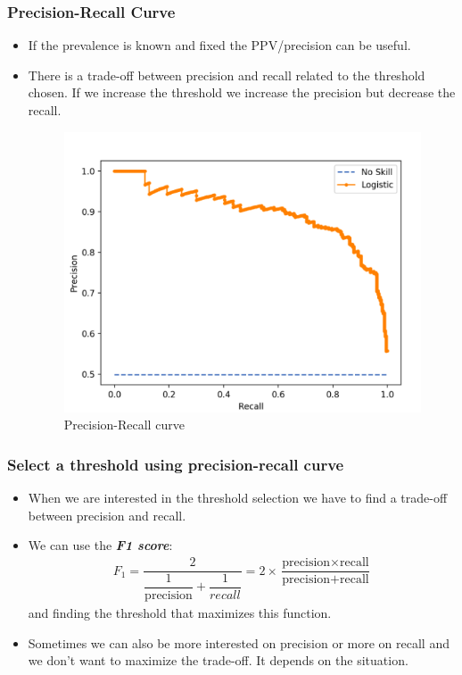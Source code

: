 \documentclass[9pt]{beamer}
\begin{document}
\begin{frame}
\frametitle{Precision-Recall Curve}
\begin{itemize}
\item If the prevalence is known and fixed the PPV/precision can be useful.
\item There is a trade-off between precision and recall related to the threshold chosen. If we increase the threshold we increase the precision but decrease the recall.
\vspace{2mm}
\begin{figure}[ht]
\includegraphics[scale=0.25]{images/precision-recall.png}
\caption{Precision-Recall curve}
\end{figure}
\end{itemize}
\end{frame}

\begin{frame}
\frametitle{Select a threshold using precision-recall curve}
\begin{itemize}
\item When we are interested in the threshold selection we have to find a trade-off between precision and recall.
\item We can use the \textbf{\textit{F1 score}}:
\begin{align}
F_1 = \dfrac{2}{\dfrac{1}{\mbox{precision}} +\dfrac{1}{recall}} = 2\times\dfrac{\mbox{precision} \times \mbox{recall}}{\mbox{precision} + \mbox{recall}}
\end{align}
and finding the threshold that maximizes this function.
\item Sometimes we can also be more interested on precision or more on recall and we don't want to maximize the trade-off. It depends on the situation.
\end{itemize}
\end{frame}
\end{document}
